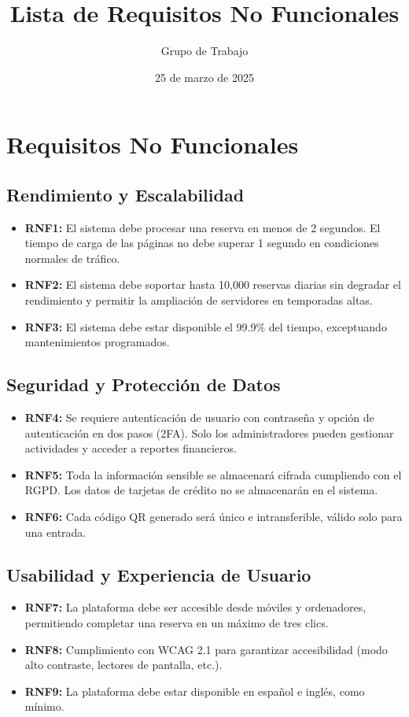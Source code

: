 \documentclass[a4paper, 12pt]{article}
\title{Lista de Requisitos No Funcionales}
\author{Grupo de Trabajo}
\date{25 de marzo de 2025}
\begin{document}
\maketitle

\section{Requisitos No Funcionales}

\subsection{Rendimiento y Escalabilidad}
\begin{itemize}
    \item \textbf{RNF1:} El sistema debe procesar una reserva en menos de 2 segundos. El tiempo de carga de las páginas no debe superar 1 segundo en condiciones normales de tráfico.
    \item \textbf{RNF2:} El sistema debe soportar hasta 10,000 reservas diarias sin degradar el rendimiento y permitir la ampliación de servidores en temporadas altas.
    \item \textbf{RNF3:} El sistema debe estar disponible el 99.9\% del tiempo, exceptuando mantenimientos programados.
\end{itemize}

\subsection{Seguridad y Protección de Datos}
\begin{itemize}
    \item \textbf{RNF4:} Se requiere autenticación de usuario con contraseña y opción de autenticación en dos pasos (2FA). Solo los administradores pueden gestionar actividades y acceder a reportes financieros.
    \item \textbf{RNF5:} Toda la información sensible se almacenará cifrada cumpliendo con el RGPD. Los datos de tarjetas de crédito no se almacenarán en el sistema.
    \item \textbf{RNF6:} Cada código QR generado será único e intransferible, válido solo para una entrada.
\end{itemize}

\subsection{Usabilidad y Experiencia de Usuario}
\begin{itemize}
    \item \textbf{RNF7:} La plataforma debe ser accesible desde móviles y ordenadores, permitiendo completar una reserva en un máximo de tres clics.
    \item \textbf{RNF8:} Cumplimiento con WCAG 2.1 para garantizar accesibilidad (modo alto contraste, lectores de pantalla, etc.).
    \item \textbf{RNF9:} La plataforma debe estar disponible en español e inglés, como mínimo.
\end{itemize}
\end{document}
